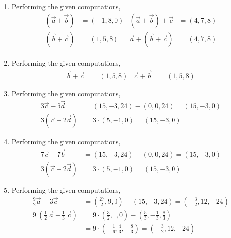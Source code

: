 \begin{enumerate}
    \item Performing the given computations,
          \begin{align}
              (\vec{a} + \vec{b})           & = (-1, 8, 0) &
              (\vec{a} + \vec{b}) + \vec{c} & = (4, 7, 8)    \\
              (\vec{b} + \vec{c})           & = (1, 5, 8)  &
              \vec{a} + (\vec{b} + \vec{c}) & = (4, 7, 8)    \\
          \end{align}

    \item Performing the given computations,
          \begin{align}
              \vec{b} + \vec{c} & = (1, 5, 8) &
              \vec{c} + \vec{b} & = (1, 5, 8)
          \end{align}

    \item Performing the given computations,
          \begin{align}
              3\vec{c} - 6\vec{d}   & = (15, -3, 24) - (0, 0, 24) = (15, -3, 0) \\
              3(\vec{c} - 2\vec{d}) & = 3 \cdot (5, -1, 0) = (15, -3, 0)
          \end{align}

    \item Performing the given computations,
          \begin{align}
              7\vec{c} - 7\vec{b}   & = (15, -3, 24) - (0, 0, 24) = (15, -3, 0) \\
              3(\vec{c} - 2\vec{d}) & = 3 \cdot (5, -1, 0) = (15, -3, 0)
          \end{align}

    \item Performing the given computations,
          \begin{align}
              \frac{9}{2}\vec{a} - 3\vec{c}                                 &
              = \left( \frac{27}{2}, 9, 0 \right) - (15, -3, 24)
              = \left( -\frac{3}{2}, 12, -24 \right)                          \\
              9\ \left( \frac{1}{2}\ \vec{a} - \frac{1}{3}\ \vec{c} \right) &
              = 9 \cdot \left( \frac{3}{2}, 1, 0 \right)
              - \left( \frac{5}{3}, -\frac{1}{3}, \frac{8}{3} \right)         \\
                                                                            &
              = 9 \cdot \left( -\frac{1}{6}, \frac{4}{3}, -\frac{8}{3} \right)
              = \left( -\frac{3}{2} , 12, -24\right)
          \end{align}


\end{enumerate}
